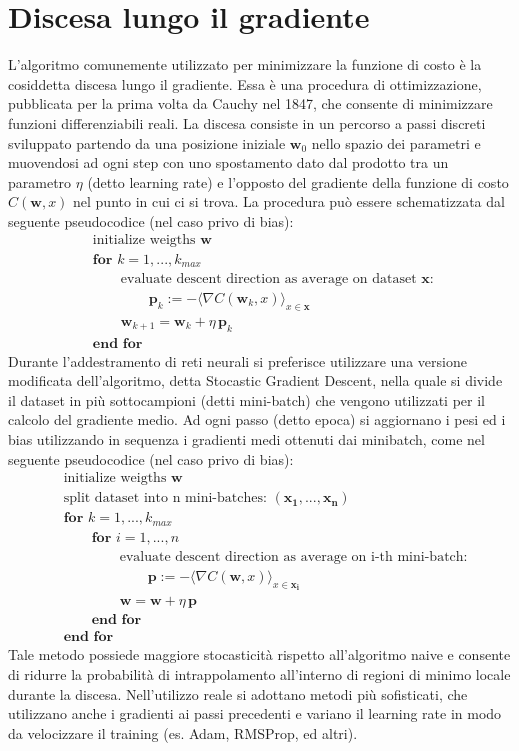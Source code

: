 \documentclass[Lau, noexaminfo, oneside]{sapthesis} %
\begin{document}
\section{Discesa lungo il gradiente}
L'algoritmo comunemente utilizzato per minimizzare la funzione di costo è la cosiddetta discesa lungo il gradiente. Essa è una procedura di ottimizzazione, pubblicata per la prima volta da Cauchy nel 1847, che consente di minimizzare funzioni differenziabili reali. La discesa consiste in un percorso a passi discreti sviluppato partendo da una posizione iniziale $\mathbf{w}_0$ nello spazio dei parametri e muovendosi ad ogni step con uno spostamento dato dal prodotto tra un parametro $\eta$ (detto learning rate) e l'opposto del gradiente della funzione di costo $C(\mathbf{w}, x)$ nel punto in cui ci si trova.
La procedura può essere schematizzata dal seguente pseudocodice (nel caso privo di bias):
\begin{align*}
& \text{initialize weigths } \mathbf{w}\\
& \textbf{for } k = 1,..., k_{max} \\
&\qquad \text{evaluate descent direction as average on dataset }\mathbf{x}\text{: } \\
& \qquad  \qquad \mathbf {p} _{k}:=- \langle \nabla C(\mathbf {w} _{k}, x) \rangle_{x \in \mathbf{x}}\\
&\qquad \mathbf {w} _{k+1}=\mathbf {w} _{k}+ \eta \, \mathbf {p} _{k}\\
&\textbf{end for}
\end{align*}
Durante l'addestramento di reti neurali si preferisce utilizzare una versione modificata dell'algoritmo, detta Stocastic Gradient Descent, nella quale si divide il dataset in più sottocampioni (detti mini-batch) che vengono utilizzati per il calcolo del gradiente medio. Ad ogni passo (detto epoca) si aggiornano i pesi ed i bias utilizzando in sequenza i gradienti medi ottenuti dai minibatch, come nel seguente pseudocodice (nel caso privo di bias):
\begin{align*}
& \text{initialize weigths } \mathbf{w}\\
& \text{split dataset into n mini-batches: }(\mathbf{x_1}, ..., \mathbf{x_n})\\
& \textbf{for } k = 1,..., k_{max} \\
& \qquad \textbf{for } i = 1,..., n \\
&\qquad \qquad {\text{evaluate descent direction as average on i-th mini-batch:}}\\
& \qquad \qquad \qquad \mathbf {p}:=- \langle \nabla C(\mathbf {w}, x)\rangle_{x \in \mathbf{x_i}} \\
&\qquad \qquad \mathbf {w}=\mathbf {w} + \eta \, \mathbf {p}\\
&\qquad \textbf{end for} \\
&\textbf{end for}
\end{align*} 
Tale metodo possiede maggiore stocasticità rispetto all'algoritmo naive e consente di ridurre la probabilità di intrappolamento all'interno di regioni di minimo locale durante la discesa.
Nell'utilizzo reale si adottano metodi più sofisticati, che utilizzano anche i gradienti ai passi precedenti e variano il learning rate in modo da velocizzare il training (es. Adam, RMSProp, ed altri).
\end{document}
